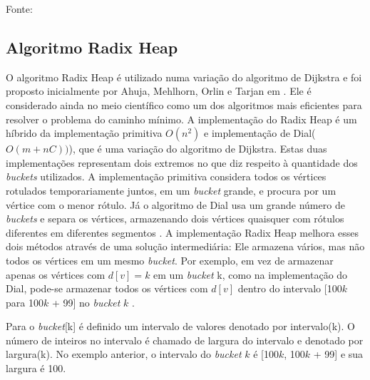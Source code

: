 \begin{algorithm}[h!]
Fonte: \cite{cormen}
\label{newdijkstra}
\end{algorithm}
\FloatBarrier

\subsection{Algoritmo Radix Heap}
O algoritmo Radix Heap é utilizado numa variação do algoritmo de Dijkstra e foi proposto inicialmente por
Ahuja, Mehlhorn, Orlin e Tarjan em \cite{ahuja}.
Ele é considerado ainda no meio científico como um dos algoritmos mais eficientes para resolver o
problema do caminho mínimo.
A implementação do Radix Heap é um híbrido da implementação primitiva $O(n^2)$ e implementação de Dial($O(m + nC))$), que
é uma variação do algoritmo de Dijkstra. 
Estas duas implementações representam dois extremos no que diz respeito à quantidade dos \textit{buckets} utilizados.
A implementação primitiva considera todos os vértices rotulados temporariamente juntos, em um \textit{bucket} grande,
e procura por um vértice com o menor rótulo. Já o algoritmo de Dial usa um grande número de \textit{buckets} e separa os vértices,
armazenando dois vértices quaisquer com rótulos diferentes em diferentes segmentos \cite{bookahuja}.
A implementação Radix Heap melhora esses dois métodos através de uma solução intermediária:
Ele armazena vários, mas não todos os vértices em um mesmo \textit{bucket}. Por exemplo, em vez de armazenar
apenas os vértices com $d[v] = k$ em um \textit{bucket} k, como na implementação do Dial,
pode-se armazenar todos os vértices com $d[v]$ dentro do intervalo [100$k$ para 100$k$ + 99] no \textit{bucket} $k$ \cite{bookahuja}.

Para o \textit{bucket}[k] é definido um intervalo de valores denotado por intervalo(k). O número de inteiros
no intervalo é chamado de largura do intervalo e denotado por largura(k).
No exemplo anterior, o intervalo do \textit{bucket} $k$ é [100$k$, 100$k$ + 99] e sua largura é 100. 

